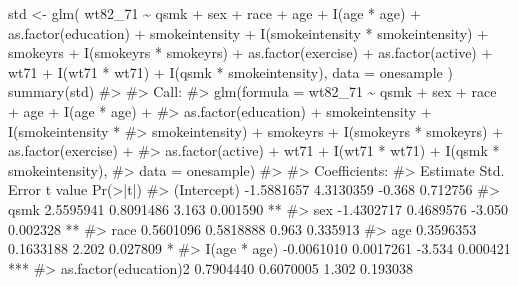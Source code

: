\documentclass[
  10pt,
  a4paper,
]{book}
\newenvironment{Shaded}{\begin{snugshade}}{\end{snugshade}}
\newcommand{\AttributeTok}[1]{\textcolor[rgb]{0.40,0.45,0.13}{#1}}
\newcommand{\CommentTok}[1]{\textcolor[rgb]{0.37,0.37,0.37}{#1}}
\newcommand{\FunctionTok}[1]{\textcolor[rgb]{0.28,0.35,0.67}{#1}}
\newcommand{\NormalTok}[1]{\textcolor[rgb]{0.00,0.46,0.62}{#1}}
\newcommand{\OtherTok}[1]{\textcolor[rgb]{0.00,0.46,0.62}{#1}}
\newcommand{\SpecialCharTok}[1]{\textcolor[rgb]{0.37,0.37,0.37}{#1}}
\begin{document}
\begin{Shaded}
\begin{Highlighting}[]
\NormalTok{std }\OtherTok{\textless{}{-}} \FunctionTok{glm}\NormalTok{(}
\NormalTok{  wt82\_71 }\SpecialCharTok{\textasciitilde{}}\NormalTok{ qsmk }\SpecialCharTok{+}\NormalTok{ sex }\SpecialCharTok{+}\NormalTok{ race }\SpecialCharTok{+}\NormalTok{ age }\SpecialCharTok{+} \FunctionTok{I}\NormalTok{(age }\SpecialCharTok{*}\NormalTok{ age)}
  \SpecialCharTok{+} \FunctionTok{as.factor}\NormalTok{(education) }\SpecialCharTok{+}\NormalTok{ smokeintensity}
  \SpecialCharTok{+} \FunctionTok{I}\NormalTok{(smokeintensity }\SpecialCharTok{*}\NormalTok{ smokeintensity) }\SpecialCharTok{+}\NormalTok{ smokeyrs}
  \SpecialCharTok{+} \FunctionTok{I}\NormalTok{(smokeyrs }\SpecialCharTok{*}\NormalTok{ smokeyrs) }\SpecialCharTok{+} \FunctionTok{as.factor}\NormalTok{(exercise)}
  \SpecialCharTok{+} \FunctionTok{as.factor}\NormalTok{(active) }\SpecialCharTok{+}\NormalTok{ wt71 }\SpecialCharTok{+} \FunctionTok{I}\NormalTok{(wt71 }\SpecialCharTok{*}\NormalTok{ wt71) }\SpecialCharTok{+} \FunctionTok{I}\NormalTok{(qsmk }\SpecialCharTok{*}\NormalTok{ smokeintensity),}
  \AttributeTok{data =}\NormalTok{ onesample}
\NormalTok{)}
\FunctionTok{summary}\NormalTok{(std)}
\CommentTok{\#\textgreater{} }
\CommentTok{\#\textgreater{} Call:}
\CommentTok{\#\textgreater{} glm(formula = wt82\_71 \textasciitilde{} qsmk + sex + race + age + I(age * age) + }
\CommentTok{\#\textgreater{}     as.factor(education) + smokeintensity + I(smokeintensity * }
\CommentTok{\#\textgreater{}     smokeintensity) + smokeyrs + I(smokeyrs * smokeyrs) + as.factor(exercise) + }
\CommentTok{\#\textgreater{}     as.factor(active) + wt71 + I(wt71 * wt71) + I(qsmk * smokeintensity), }
\CommentTok{\#\textgreater{}     data = onesample)}
\CommentTok{\#\textgreater{} }
\CommentTok{\#\textgreater{} Coefficients:}
\CommentTok{\#\textgreater{}                                      Estimate Std. Error t value Pr(\textgreater{}|t|)    }
\CommentTok{\#\textgreater{} (Intercept)                        {-}1.5881657  4.3130359  {-}0.368 0.712756    }
\CommentTok{\#\textgreater{} qsmk                                2.5595941  0.8091486   3.163 0.001590 ** }
\CommentTok{\#\textgreater{} sex                                {-}1.4302717  0.4689576  {-}3.050 0.002328 ** }
\CommentTok{\#\textgreater{} race                                0.5601096  0.5818888   0.963 0.335913    }
\CommentTok{\#\textgreater{} age                                 0.3596353  0.1633188   2.202 0.027809 *  }
\CommentTok{\#\textgreater{} I(age * age)                       {-}0.0061010  0.0017261  {-}3.534 0.000421 ***}
\CommentTok{\#\textgreater{} as.factor(education)2               0.7904440  0.6070005   1.302 0.193038    }

\end{Highlighting}
\end{Shaded}
\end{document}
